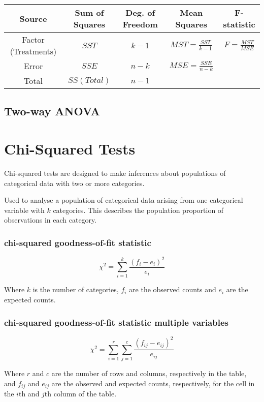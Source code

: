 \documentclass{article}
\begin{document}
\begin{center}
\begin{tabular}{ c c c c c }
 \hline
 Source & Sum of Squares & Deg. of Freedom & Mean Squares & F-statistic\\ 
 \hline
 Factor (Treatments) & $SST$ & $k - 1$ & $MST = \frac{SST}{k-1}$ & $F = \frac{MST}{MSE}$\\  
 Error & $SSE$ & $n - k$ & $MSE = \frac{SSE}{n - k}$    \\
  \hline
 Total & $SS(Total)$ & $n -1$
\end{tabular}
\end{center}

\subsection{Two-way ANOVA}




\section{Chi-Squared Tests}

Chi-squared tests are designed to make inferences about populations of categorical data with two or more categories.

Used to analyse a population of categorical data arising from one categorical variable with $k$ categories. This describes the population proportion of observations in each category.

\subsubsection{chi-squared goodness-of-fit statistic}

$$
\chi^2 = \sum_{i=1}^k \frac{(f_i - e_i)^2}{e_i}
$$

Where $k$ is the number of categories, $f_i$ are the observed counts and $e_i$ are the expected counts.


\subsubsection{chi-squared goodness-of-fit statistic multiple variables}

$$
\chi^2 = \sum_{i=1}^r \sum_{j=1}^c \frac{(f_{ij} - e_{ij})^2}{e_{ij}}
$$

Where $r$ and $c$ are the number of rows and columns, respectively in the table, and $f_{ij}$ and $e_{ij}$ are the observed and expected counts, respectively, for the cell in the $i$th and $j$th column of the table.
\end{document}
